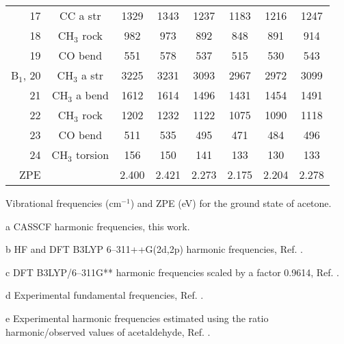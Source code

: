 \begin{center}
\begin{threeparttable}
\begin{tabular*}{\textwidth}{r@{\hspace*{10mm}}ccccccc}
       17 & CC a str                  & 1329 & 1343 & 1237 & 1183 & 1216 & 1247 \\
       18 & CH$_3$ rock               &  982 &  973 &  892 &  848 &  891 &  914 \\
       19 & CO bend                   &  551 &  578 &  537 &  515 &  530 &  543 \\
B$_1$, 20 & CH$_3$ a str              & 3225 & 3231 & 3093 & 2967 & 2972 & 3099 \\
       21 & CH$_3$ a bend             & 1612 & 1614 & 1496 & 1431 & 1454 & 1491 \\
       22 & CH$_3$ rock               & 1202 & 1232 & 1122 & 1075 & 1090 & 1118 \\
       23 & CO bend                   &  511 &  535 &  495 &  471 &  484 &  496 \\
       24 & CH$_3$ torsion            &  156 &  150 &  141 &  133 &  130 &  133 \\
\hline                                                                          
   ZPE    &                           & 2.400& 2.421& 2.273& 2.175& 2.204& 2.278\\ \hline
\end{tabular*}
\caption{\footnotesize Vibrational frequencies (cm$^{-1}$) and ZPE (eV)
for the ground state of acetone.
}\label{tbl:vibra_aceto}
\begin{tablenotes}
\footnotesize
\item[a]CASSCF harmonic frequencies, this work.
\item[b]HF and DFT B3LYP 6--311++G(2d,2p) harmonic frequencies, Ref. .
\item[c]DFT B3LYP/6--311G** harmonic frequencies scaled by a factor 0.9614, Ref.  .
\item[d]Experimental fundamental frequencies, Ref. .
\item[e]Experimental harmonic frequencies estimated using the ratio harmonic/observed 
values of acetaldehyde, Ref. .
\end{tablenotes}
\end{threeparttable}
\end{center}
